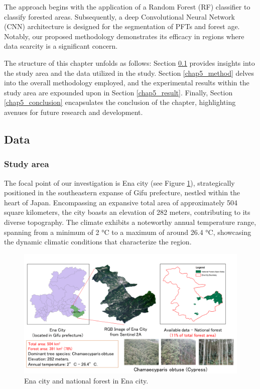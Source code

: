 The approach begins with the application of a Random Forest (RF) classifier to classify forested areas. Subsequently, a deep Convolutional Neural Network (CNN) architecture is designed for the segmentation of PFTs and forest age. Notably, our proposed methodology demonstrates its efficacy in regions where data scarcity is a significant concern. \par

The structure of this chapter unfolds as follows: Section \ref{chap5_data} provides insights into the study area and the data utilized in the study. Section \ref{chap5_method} delves into the overall methodology employed, and the experimental results within the study area are expounded upon in Section \ref{chap5_result}. Finally, Section \ref{chap5_conclusion} encapsulates the conclusion of the chapter, highlighting avenues for future research and development. \par

\subsection{Data} \label{chap5_data}
\subsubsection{Study area}
The focal point of our investigation is Ena city (see Figure \ref{fig:chap5_studyarea}), strategically positioned in the southeastern expanse of Gifu prefecture, nestled within the heart of Japan. Encompassing an expansive total area of approximately 504 square kilometers, the city boasts an elevation of 282 meters, contributing to its diverse topography. The climate exhibits a noteworthy annual temperature range, spanning from a minimum of 2 °C to a maximum of around 26.4 °C, showcasing the dynamic climatic conditions that characterize the region. \par

\begin{figure}[tbh!]
    \centering
    \includegraphics[width=\textwidth]{figs/chap5/study_area_ena.png}
    \caption[National forest in Ena city]{Ena city and national forest in Ena city.}
    \label{fig:chap5_studyarea}
\end{figure}

